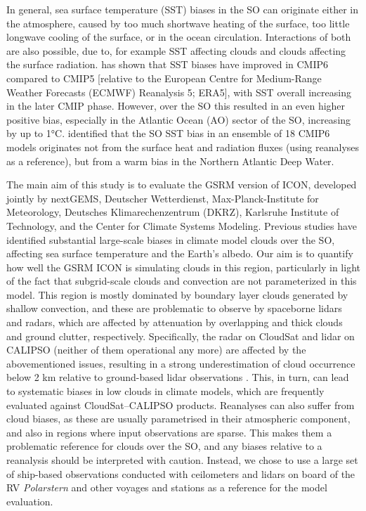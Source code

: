 \documentclass[12pt,a4paper]{article}
\begin{document}
In general, sea surface temperature (SST) biases in the SO can originate either
in the atmosphere, caused by too much shortwave heating of the surface, too
little longwave cooling of the surface, or in the ocean circulation.
Interactions of both are also possible, due to, for example SST affecting
clouds and clouds affecting the surface radiation. \cite{zhang2023} has shown
that SST biases have improved in CMIP6 compared to CMIP5 [relative to the
European Centre for Medium-Range Weather Forecasts (ECMWF) Reanalysis 5; ERA5],
with SST overall increasing in the later CMIP phase. However, over the SO this
resulted in an even higher positive bias, especially in the Atlantic Ocean (AO)
sector of the SO, increasing by up to 1°C.  \cite{luo2023} identified that the
SO SST bias in an ensemble of 18 CMIP6 models originates not from the surface
heat and radiation fluxes (using reanalyses as a reference), but from a warm
bias in the Northern Atlantic Deep Water.

The main aim of this study is to evaluate the GSRM version of ICON, developed
jointly by nextGEMS, Deutscher Wetterdienst, Max-Planck-Institute for
Meteorology, Deutsches Klimarechenzentrum (DKRZ), Karlsruhe Institute of
Technology, and the Center for Climate Systems Modeling.  Previous studies have
identified substantial large-scale biases in climate model clouds over the SO,
affecting sea surface temperature and the Earth’s albedo. Our aim is to
quantify how well the GSRM ICON is simulating clouds in this region,
particularly in light of the fact that subgrid-scale clouds and convection are
not parameterized in this model. This region is mostly dominated by boundary
layer clouds generated by shallow convection, and these are problematic to
observe by spaceborne lidars and radars, which are affected by attenuation by
overlapping and thick clouds and ground clutter, respectively.  Specifically,
the radar on CloudSat and lidar on CALIPSO (neither of them operational any
more) are affected by the abovementioned issues, resulting in a strong
underestimation of cloud occurrence below 2 km relative to ground-based lidar
observations \citep{mcerlich2021}.  This, in turn, can lead to systematic
biases in low clouds in climate models, which are frequently evaluated against
CloudSat--CALIPSO products. Reanalyses can also suffer from cloud biases, as
these are usually parametrised in their atmospheric component, and also in
regions where input observations are sparse.  This makes them a problematic
reference for clouds over the SO, and any biases relative to a reanalysis
should be interpreted with caution. Instead, we chose to use a large set of
ship-based observations conducted with ceilometers and lidars on board of the
RV \emph{Polarstern} and other voyages and stations as a reference for the
model evaluation.
\end{document}
